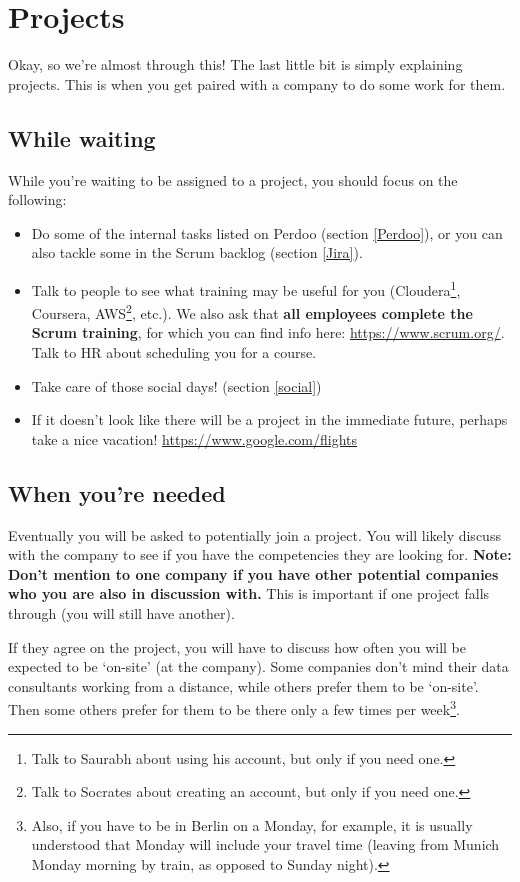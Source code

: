 \documentclass[11pt]{report}
\begin{document}
\section{Projects}
\label{Projects}
Okay, so we're almost through this! The last little bit is simply explaining projects. This is when you get paired with a company to do some work for them.

\subsection{While waiting}
While you're waiting to be assigned to a project, you should focus on the following:
\begin{itemize}
\item Do some of the internal tasks listed on Perdoo (section \ref{Perdoo}), or you can also tackle some in the Scrum backlog (section \ref{Jira}).
\item Talk to people to see what training may be useful for you (Cloudera\footnote{Talk to Saurabh about using his account, but only if you need one.}, Coursera, AWS\footnote{Talk to Socrates about creating an account, but only if you need one.}, etc.). We also ask that \textbf{all employees complete the Scrum training}, for which you can find info here: \href{https://www.scrum.org/}{https://www.scrum.org/}. Talk to HR about scheduling you for a course.
\item Take care of those social days! (section \ref{social})
\item If it doesn't look like there will be a project in the immediate future, perhaps take a nice vacation!
\href{https://www.google.com/flights}{https://www.google.com/flights}
\end{itemize}

\subsection{When you're needed}
\label{when you're needed}
Eventually you will be asked to potentially join a project. You will likely discuss with the company to see if you have the competencies they are looking for. \textbf{Note: Don't mention to one company if you have other potential companies who you are also in discussion with.} This is important if one project falls through (you will still have another).

If they agree on the project, you will have to discuss how often you will be expected to be `on-site' (at the company). Some companies don't mind their data consultants working from a distance, while others prefer them to be `on-site'. Then some others prefer for them to be there only a few times per week\footnote{Also, if you have to be in Berlin on a Monday, for example, it is usually understood that Monday will include your travel time (leaving from Munich Monday morning by train, as opposed to Sunday night).}.
\end{document}
